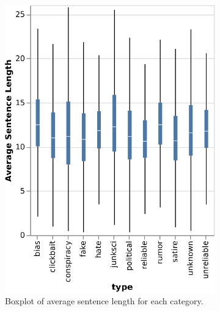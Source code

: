 \begin{figure}[!ht]
  \centering
  \begin{subfigure}[b]{0.4\textwidth}
    \includegraphics{images/data_exploration/boxplot_avgSentLen.eps}
    \caption{Boxplot of average sentence length for each category.}
  \end{subfigure}
  \hfill
  \begin{subfigure}[b]{0.4\textwidth}

\end{subfigure}
\end{figure}
